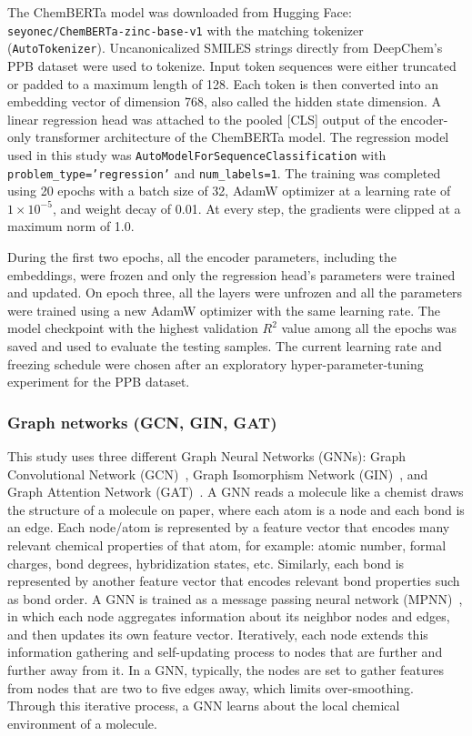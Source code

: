 \documentclass[11pt,a4paper]{article}
\begin{document}
The ChemBERTa model was downloaded from Hugging Face: \texttt{seyonec/ChemBERTa-zinc-base-v1} with the matching tokenizer (\texttt{AutoTokenizer}).
Uncanonicalized SMILES strings directly from DeepChem's PPB dataset were used to tokenize.
Input token sequences were either truncated or padded to a maximum length of 128.
Each token is then converted into an embedding vector of dimension 768, also called the hidden state dimension.
A linear regression head was attached to the pooled [CLS] output of the encoder-only transformer architecture of the ChemBERTa model.
The regression model used in this study was \texttt{AutoModelForSequenceClassification} with \texttt{problem\_type='regression'} and \texttt{num\_labels=1}.
The training was completed using 20 epochs with a batch size of 32, AdamW optimizer at a learning rate of $1\times 10^{-5}$, and weight decay of 0.01.
At every step, the gradients were clipped at a maximum norm of 1.0.

During the first two epochs, all the encoder parameters, including the embeddings, were frozen and only the regression head's parameters were trained and updated.
On epoch three, all the layers were unfrozen and all the parameters were trained using a new AdamW optimizer with the same learning rate.
The model checkpoint with the highest validation $R^{2}$ value among all the epochs was saved and used to evaluate the testing samples.
The current learning rate and freezing schedule were chosen after an exploratory hyper-parameter-tuning experiment for the PPB dataset.

\subsubsection{Graph networks (GCN, GIN, GAT)}
\label{sec:graph-networks}
This study uses three different Graph Neural Networks (GNNs): Graph Convolutional Network (GCN)~\cite{kipf2017gcn}, Graph Isomorphism Network (GIN)~\cite{xu2019gin}, and Graph Attention Network (GAT)~\cite{velickovic2018gat}.
A GNN reads a molecule like a chemist draws the structure of a molecule on paper, where each atom is a node and each bond is an edge.
Each node/atom is represented by a feature vector that encodes many relevant chemical properties of that atom, for example: atomic number, formal charges, bond degrees, hybridization states, etc.
Similarly, each bond is represented by another feature vector that encodes relevant bond properties such as bond order.
A GNN is trained as a message passing neural network (MPNN)~\cite{gilmer2017mpnn}, in which each node aggregates information about its neighbor nodes and edges, and then updates its own feature vector.
Iteratively, each node extends this information gathering and self-updating process to nodes that are further and further away from it.
In a GNN, typically, the nodes are set to gather features from nodes that are two to five edges away, which limits over-smoothing.
Through this iterative process, a GNN learns about the local chemical environment of a molecule.
\end{document}

